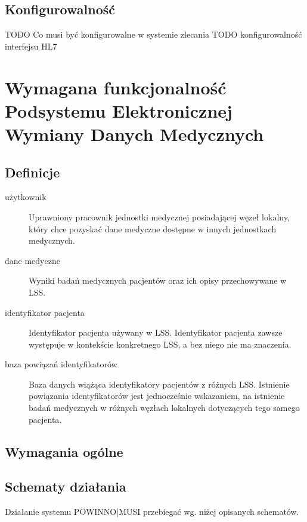 \documentclass[a4paper]{report}
\begin{document}
\section{Konfigurowalność}

TODO Co musi być konfigurowalne w systemie zlecania 
TODO konfigurowalność interfejsu HL7

\chapter[Podsystem Elektronicznej Wymiany Danych Medycznych]{Wymagana funkcjonalność Podsystemu Elektronicznej Wymiany Danych Medycznych}

\section{Definicje}
\begin{description}
\item[użytkownik] Uprawniony pracownik jednostki medycznej posiadającej węzeł lokalny, który chce pozyskać dane
      medyczne dostępne w innych jednostkach medycznych.
\item[dane medyczne] Wyniki badań medycznych pacjentów oraz ich opisy przechowywane w LSS.
\item[identyfikator pacjenta] Identyfikator pacjenta używany w LSS. Identyfikator pacjenta zawsze występuje w kontekście
      konkretnego LSS, a bez niego nie ma znaczenia.
\item[baza powiązań identyfikatorów] Baza danych wiążąca identyfikatory pacjentów z różnych LSS. Istnienie powiązania
      identyfikatorów jest jednocześnie wskazaniem, na istnienie badań medycznych w różnych węzłach lokalnych dotyczących
      tego samego pacjenta.
\end{description}

\section{Wymagania ogólne}



\section{Schematy działania}

Działanie systemu POWINNO|MUSI przebiegać wg. niżej opisanych schematów.
\end{document}
